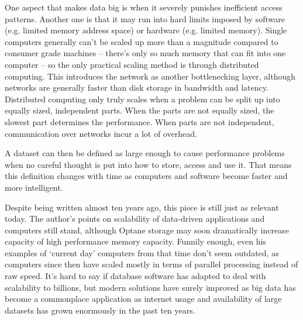 \documentclass{article}
\begin{document}
One aspect that makes data big is when it severely punishes inefficient access 
patterns. Another one is that it may run into hard limits imposed by software 
(e.g. limited memory address space) or hardware (e.g. limited memory). Single 
computers generally can’t be scaled up more than a magnitude compared to 
consumer grade machines – there’s only so much memory that can fit into one 
computer – so the only practical scaling method is through distributed 
computing. This introduces the network as another bottlenecking layer, 
although networks are generally faster than disk storage in bandwidth and 
latency. Distributed computing only truly scales when a problem can be split 
up into equally sized, independent parts. When the parts are not equally 
sized, the slowest part determines the performance. When parts are not 
independent, communication over networks incur a lot of overhead.

A dataset can then be defined as large enough to cause performance problems 
when no careful thought is put into how to store, access and use it. That means
this definition changes with time as computers and software become faster and 
more intelligent.

\vspace{2em}

Despite being written almost ten years ago, this piece is still just as relevant 
today. The author’s points on scalability of data-driven applications and 
computers still stand, although Optane storage may soon dramatically increase 
capacity of high performance memory capacity. Funnily enough, even his examples 
of ‘current day’ computers from that time don’t seem outdated, as computers 
since then have scaled mostly in terms of parallel processing instead of raw 
speed. It’s hard to say if database software has adapted to deal with 
scalability to billions, but modern solutions have surely improved as big data 
has become a commonplace application as internet usage and availability of large 
datasets has grown enormously in the past ten years.
\end{document}
